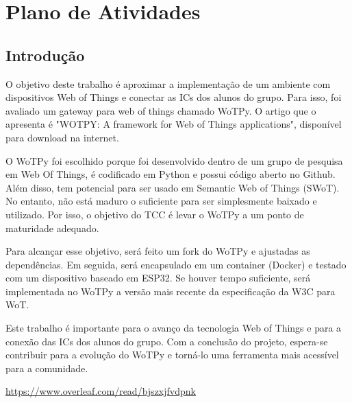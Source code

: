 \chapter{Plano de Atividades}


\section{Introdução}

O objetivo deste trabalho é aproximar a implementação de um ambiente com dispositivos Web of Things e conectar as ICs dos alunos do grupo. Para isso, foi avaliado um gateway para web of things chamado WoTPy. O artigo que o apresenta é "WOTPY: A framework for Web of Things applications", disponível para download na internet.

O WoTPy foi escolhido porque foi desenvolvido dentro de um grupo de pesquisa em Web Of Things, é codificado em Python e possui código aberto no Github. Além disso, tem potencial para ser usado em Semantic Web of Things (SWoT). No entanto, não está maduro o suficiente para ser simplesmente baixado e utilizado. Por isso, o objetivo do TCC é levar o WoTPy a um ponto de maturidade adequado.

Para alcançar esse objetivo, será feito um fork do WoTPy e ajustadas as dependências. Em seguida, será encapsulado em um container (Docker) e testado com um dispositivo baseado em ESP32. Se houver tempo suficiente, será implementada no WoTPy a versão mais recente da especificação da W3C para WoT.

Este trabalho é importante para o avanço da tecnologia Web of Things e para a conexão das ICs dos alunos do grupo. Com a conclusão do projeto, espera-se contribuir para a evolução do WoTPy e torná-lo uma ferramenta mais acessível para a comunidade.

\url{https://www.overleaf.com/read/bjszxjfvdpnk}
